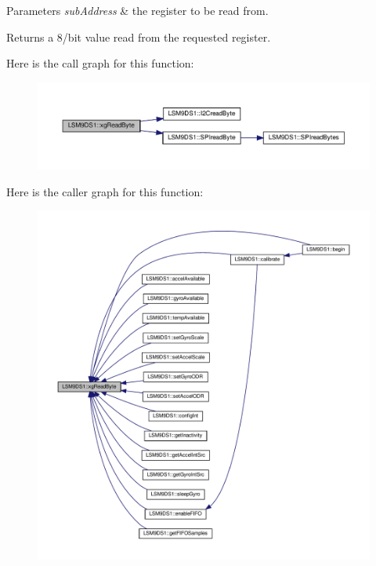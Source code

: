 \begin{DoxyParams}{Parameters}
{\em sub\+Address} & the register to be read from. \\
\hline
\end{DoxyParams}
\begin{DoxyReturn}{Returns}
a 8/bit value read from the requested register. 
\end{DoxyReturn}
Here is the call graph for this function\+:
\nopagebreak
\begin{figure}[H]
\begin{center}
\leavevmode
\includegraphics[width=350pt]{classLSM9DS1_af7f9789df6f0178764c815a3380c202a_cgraph}
\end{center}
\end{figure}
Here is the caller graph for this function\+:
\nopagebreak
\begin{figure}[H]
\begin{center}
\leavevmode
\includegraphics[width=350pt]{classLSM9DS1_af7f9789df6f0178764c815a3380c202a_icgraph}
\end{center}
\end{figure}
\mbox{\label{classLSM9DS1_ae0a9cbfd74b1f4676f091c2d8e491d77}} 
